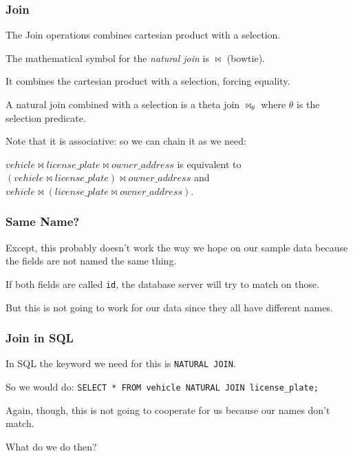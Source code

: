 \begin{frame}
\frametitle{Join}

The \alert{Join} operations combines cartesian product with a selection.

The mathematical symbol for the \textit{natural join} is $\Join$ (bowtie). 

It combines the cartesian product with a selection, forcing equality. 

A natural join combined with a selection is a theta join $\Join_{\theta}$ where $\theta$ is the selection predicate.

 Note that it is associative: so we can chain it as we need: 
 
 $vehicle \Join license\_plate \Join owner\_address$ is equivalent to  $(vehicle \Join license\_plate) \Join owner\_address$  and $vehicle \Join (license\_plate \Join owner\_address)$.


\end{frame}



\begin{frame}
\frametitle{Same Name?}

Except, this probably doesn't work the way we hope on our sample data because the fields are not named the same thing. 

If both fields are called \texttt{id}, the database server will try to match on those. 

But this is not going to work for our data since they all have different names. 


\end{frame}



\begin{frame}
\frametitle{Join in SQL}

In SQL the keyword we need for this is \texttt{NATURAL JOIN}. 

So we would do: \texttt{SELECT * FROM vehicle NATURAL JOIN license\_plate;} 

Again, though, this is not going to cooperate for us because our names don't match.

What do we do then?

\end{frame}



